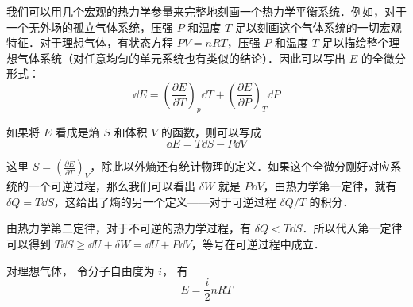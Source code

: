 我们可以用几个宏观的热力学参量来完整地刻画一个热力学平衡系统．例如，对于一个无外场的孤立气体系统，压强 $P$ 和温度 $T$ 足以刻画这个气体系统的一切宏观特征．对于理想气体，有状态方程 $PV=nRT$，压强 $P$ 和温度 $T$ 足以描绘整个理想气体系统（对任意均匀的单元系统也有类似的结论）．因此可以写出 $E$ 的全微分形式：
\begin{equation}
\dd E=\left(\frac{\partial E}{\partial T}\right)_p \dd T + \left(\frac{\partial E}{\partial P}\right)_T \dd P
\end{equation}

如果将 $E$ 看成是熵 $S$  和体积 $V$ 的函数，则可以写成
\begin{equation}
\dd E=T\dd S-P\dd V
\end{equation}

这里 $S=\left(\frac{\partial E}{\partial T}\right)_V$，除此以外熵还有统计物理的定义．如果这个全微分刚好对应系统的一个可逆过程，那么我们可以看出 $\delta W$ 就是 $P\dd V$，由热力学第一定律，就有 $\delta Q=T\dd S$，这给出了熵的另一个定义——对于可逆过程 $\delta Q/T$ 的积分．

由热力学第二定律，对于不可逆的热力学过程，有 $\delta Q<T\dd S$．所以代入第一定律可以得到 $T\dd S\ge \dd U+\delta W=\dd U+P\dd V$，等号在可逆过程中成立．

对理想气体， 令分子自由度为 $i$， 有
\begin{equation}
E = \frac{i}{2}n RT
\end{equation}

